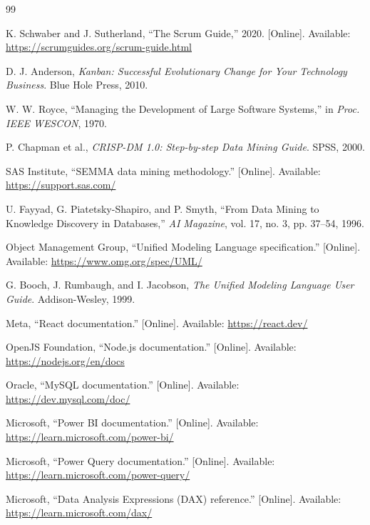 \documentclass[12pt,a4paper]{report}
\begin{document}
\cleardoublepage
\renewcommand{\bibname}{Bibliographie}
{}
\begin{thebibliography}{99}

K. Schwaber and J. Sutherland, ``The Scrum Guide,'' 2020. [Online]. Available: \url{https://scrumguides.org/scrum-guide.html}

D. J. Anderson, \textit{Kanban: Successful Evolutionary Change for Your Technology Business}. Blue Hole Press, 2010.

W. W. Royce, ``Managing the Development of Large Software Systems,'' in \textit{Proc. IEEE WESCON}, 1970.

P. Chapman et al., \textit{CRISP-DM 1.0: Step-by-step Data Mining Guide}. SPSS, 2000.

SAS Institute, ``SEMMA data mining methodology.'' [Online]. Available: \url{https://support.sas.com/}

U. Fayyad, G. Piatetsky-Shapiro, and P. Smyth, ``From Data Mining to Knowledge Discovery in Databases,'' \textit{AI Magazine}, vol. 17, no. 3, pp. 37--54, 1996.

Object Management Group, ``Unified Modeling Language specification.'' [Online]. Available: \url{https://www.omg.org/spec/UML/}

G. Booch, J. Rumbaugh, and I. Jacobson, \textit{The Unified Modeling Language User Guide}. Addison-Wesley, 1999.

Meta, ``React documentation.'' [Online]. Available: \url{https://react.dev/}

OpenJS Foundation, ``Node.js documentation.'' [Online]. Available: \url{https://nodejs.org/en/docs}

Oracle, ``MySQL documentation.'' [Online]. Available: \url{https://dev.mysql.com/doc/}

Microsoft, ``Power BI documentation.'' [Online]. Available: \url{https://learn.microsoft.com/power-bi/}

Microsoft, ``Power Query documentation.'' [Online]. Available: \url{https://learn.microsoft.com/power-query/}

Microsoft, ``Data Analysis Expressions (DAX) reference.'' [Online]. Available: \url{https://learn.microsoft.com/dax/}


\end{thebibliography}
\end{document}
